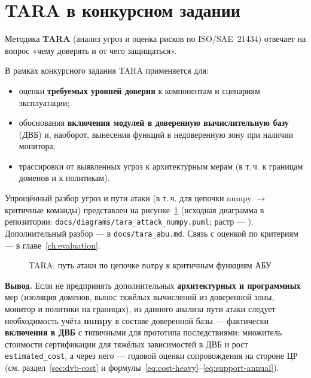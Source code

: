 \section{TARA в конкурсном задании}
\label{sec:tara-contest}

Методика \textbf{TARA} (анализ угроз и оценка рисков по ISO/SAE~21434) отвечает на вопрос «чему доверять и от чего защищаться».

В рамках конкурсного задания TARA применяется для:
\begin{itemize}
  \item оценки \textbf{требуемых уровней доверия} к компонентам и сценариям эксплуатации;
  \item обоснования \textbf{включения модулей в доверенную вычислительную базу} (ДВБ) и, наоборот, вынесения функций в недоверенную зону при наличии монитора;
  \item трассировки от выявленных угроз к архитектурным мерам (в т.\,ч. к границам доменов и к политикам).
\end{itemize}

Упрощённый разбор угроз и пути атаки (в т.\,ч. для цепочки numpy $\rightarrow$ критичные команды) представлен на рисунке~\ref{fig:tara-numpy} (исходная диаграмма в репозитории: \texttt{docs/diagrams/tara\_attack\_numpy.puml}; растр --- ). Дополнительный разбор --- в \texttt{docs/tara\_abu.md}. Связь с оценкой по критериям --- в главе~\ref{ch:evaluation}.

\begin{figure}[htbp]
  \centering
  \caption{TARA: путь атаки по цепочке \texttt{numpy} к критичным функциям АБУ}
  \label{fig:tara-numpy}
\end{figure}

\textbf{Вывод.} Если не предпринять дополнительных \textbf{архитектурных и программных} мер (изоляция доменов, вынос тяжёлых вычислений из доверенной зоны, монитор и политики на границах), из данного анализа пути атаки следует необходимость учёта \textbf{numpy} в составе доверенной базы --- фактически \textbf{включения в ДВБ} с типичными для прототипа последствиями: множитель стоимости сертификации для тяжёлых зависимостей в ДВБ и рост \texttt{estimated\_cost}, а через него --- годовой оценки сопровождения на стороне ЦР (см. раздел~\ref{sec:dvb-cost} и формулы~\eqref{eq:cost-heavy}--\eqref{eq:support-annual}).

